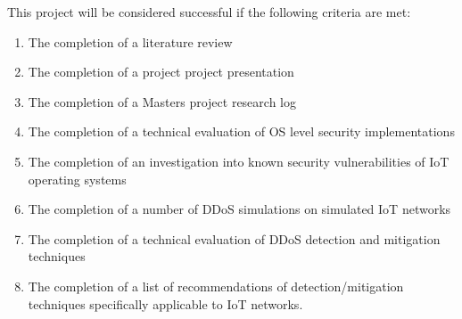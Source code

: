This project will be considered successful if the following criteria are met:

\begin{enumerate}
	\item The completion of a literature review
	\item The completion of a project project presentation
	\item The completion of a Masters project research log
	\item The completion of a technical evaluation of OS level
		security implementations
	\item The completion of an investigation into known security
		vulnerabilities of IoT operating systems
	\item The completion of a number of DDoS simulations on simulated IoT
		networks
	\item The completion of a technical evaluation of DDoS detection and
		mitigation techniques
	\item The completion of a list of recommendations of
		detection/mitigation techniques specifically applicable to IoT
		networks.
\end{enumerate}
